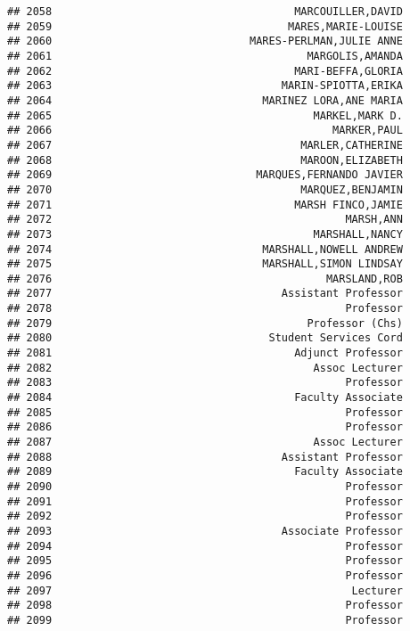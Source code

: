 \documentclass[
]{article}
\begin{document}
\begin{verbatim}
## 2058                                      MARCOUILLER,DAVID
## 2059                                     MARES,MARIE-LOUISE
## 2060                               MARES-PERLMAN,JULIE ANNE
## 2061                                        MARGOLIS,AMANDA
## 2062                                      MARI-BEFFA,GLORIA
## 2063                                    MARIN-SPIOTTA,ERIKA
## 2064                                 MARINEZ LORA,ANE MARIA
## 2065                                         MARKEL,MARK D.
## 2066                                            MARKER,PAUL
## 2067                                       MARLER,CATHERINE
## 2068                                       MAROON,ELIZABETH
## 2069                                MARQUES,FERNANDO JAVIER
## 2070                                       MARQUEZ,BENJAMIN
## 2071                                      MARSH FINCO,JAMIE
## 2072                                              MARSH,ANN
## 2073                                         MARSHALL,NANCY
## 2074                                 MARSHALL,NOWELL ANDREW
## 2075                                 MARSHALL,SIMON LINDSAY
## 2076                                           MARSLAND,ROB
## 2077                                    Assistant Professor
## 2078                                              Professor
## 2079                                        Professor (Chs)
## 2080                                  Student Services Cord
## 2081                                      Adjunct Professor
## 2082                                         Assoc Lecturer
## 2083                                              Professor
## 2084                                      Faculty Associate
## 2085                                              Professor
## 2086                                              Professor
## 2087                                         Assoc Lecturer
## 2088                                    Assistant Professor
## 2089                                      Faculty Associate
## 2090                                              Professor
## 2091                                              Professor
## 2092                                              Professor
## 2093                                    Associate Professor
## 2094                                              Professor
## 2095                                              Professor
## 2096                                              Professor
## 2097                                               Lecturer
## 2098                                              Professor
## 2099                                              Professor

\end{verbatim}
\end{document}
